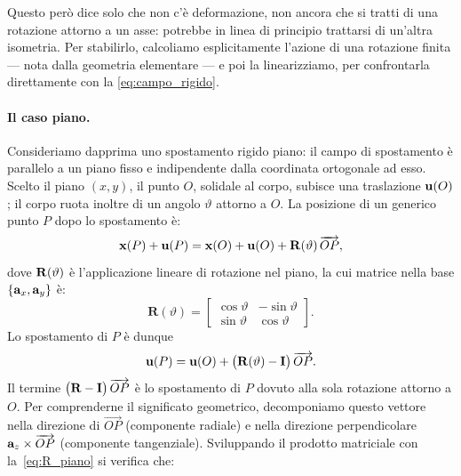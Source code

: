 Questo però dice solo che non c'è deformazione, non ancora che si tratti di una rotazione attorno a un asse: potrebbe in linea di principio trattarsi di un'altra isometria. Per stabilirlo, calcoliamo esplicitamente l'azione di una rotazione finita — nota dalla geometria elementare — e poi la linearizziamo, per confrontarla direttamente con la \eqref{eq:campo_rigido}. 



\paragraph{Il caso piano.}
Consideriamo dapprima uno spostamento rigido piano: il campo di spostamento è parallelo a un piano fisso e indipendente dalla coordinata ortogonale ad esso. Scelto il piano $(x,y)$, il punto $O$, solidale al corpo, subisce una traslazione $\mathbf{u}(O)$; il corpo ruota inoltre di un angolo $\vartheta$ attorno a $O$. La posizione di un generico punto $P$ dopo lo spostamento è:
\begin{equation}\label{eq:pos_finale_piano}
	\mathbf{x}(P) + \mathbf{u}(P) = \mathbf{x}(O) + \mathbf{u}(O)
	+ \mathbf{R}(\vartheta)\,\overrightarrow{OP},
\end{equation}
dove $\mathbf{R}(\vartheta)$ è l'applicazione lineare di rotazione nel piano, la cui
matrice nella base $\{\mathbf{a}_x,\mathbf{a}_y\}$ è:
\begin{equation}\label{eq:R_piano}
	\bm{R}(\vartheta) = \begin{bmatrix}
		\cos\vartheta & -\sin\vartheta \\
		\sin\vartheta & \cos\vartheta
	\end{bmatrix}.
\end{equation}
Lo spostamento di $P$ è dunque
\begin{equation}\label{eq:spost_finito_piano}
	\mathbf{u}(P) = \mathbf{u}(O) + \bigl(\mathbf{R}(\vartheta) - \mathbf{I}\bigr)\,\overrightarrow{OP}.
\end{equation}
Il termine $\bigl(\mathbf{R} - \mathbf{I}\bigr)\,\overrightarrow{OP}$ è lo
spostamento di $P$ dovuto alla sola rotazione attorno a $O$. Per
comprenderne il significato geometrico, decomponiamo questo vettore
nella direzione di $\overrightarrow{OP}$ (componente radiale) e nella
direzione perpendicolare $\mathbf{a}_z \times \overrightarrow{OP}$ (componente
tangenziale). Sviluppando il prodotto matriciale con
la~\eqref{eq:R_piano} si verifica che:
